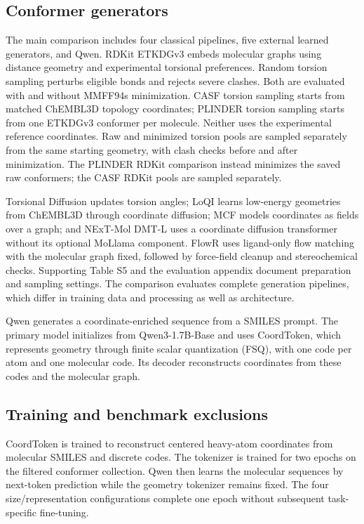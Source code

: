 \subsection{Conformer generators}

The main comparison includes four classical pipelines, five external learned generators,
and Qwen. RDKit ETKDGv3\cite{wang2020etkdg} embeds molecular graphs using distance geometry
and experimental torsional preferences. Random torsion sampling perturbs eligible
bonds and rejects severe clashes. Both are evaluated with and without
MMFF94s\cite{halgren1999mmff94s} minimization. CASF torsion sampling starts from matched
ChEMBL3D topology coordinates; PLINDER torsion sampling starts from one ETKDGv3
conformer per molecule. Neither uses the experimental reference coordinates. Raw and
minimized torsion pools are sampled separately from the same starting geometry,
with clash checks before and after minimization. The PLINDER RDKit comparison instead
minimizes the saved raw conformers; the CASF RDKit pools are sampled separately.

Torsional Diffusion\cite{jing2022torsional} updates torsion angles;
LoQI\cite{nikitin2025loqi} learns low-energy geometries from ChEMBL3D through coordinate
diffusion; MCF\cite{wang2024mcf} models coordinates as fields over a graph; and
NExT-Mol DMT-L\cite{liu2025nextmol} uses a coordinate diffusion transformer without its
optional MoLlama component. FlowR\cite{cremer2025flowr} uses ligand-only flow matching
with the molecular graph fixed, followed by force-field cleanup and stereochemical
checks. Supporting Table S5 and the evaluation appendix document preparation and
sampling settings. The comparison evaluates complete generation pipelines, which
differ in training data and processing as well as architecture.

Qwen generates a coordinate-enriched sequence from a SMILES prompt. The primary model
initializes from Qwen3-1.7B-Base\cite{yang2025qwen3} and uses CoordToken,\cite{geikyan2026coordtoken}
which represents geometry through finite scalar quantization (FSQ), with one code per
atom and one molecular code. Its decoder reconstructs coordinates from these codes
and the molecular graph.

\subsection{Training and benchmark exclusions}

CoordToken is trained to reconstruct centered heavy-atom coordinates from molecular
SMILES and discrete codes. The tokenizer is trained for two epochs on the filtered
conformer collection. Qwen then learns the molecular sequences by next-token prediction
while the geometry tokenizer remains fixed. The four size/representation configurations
complete one epoch without
subsequent task-specific fine-tuning.

